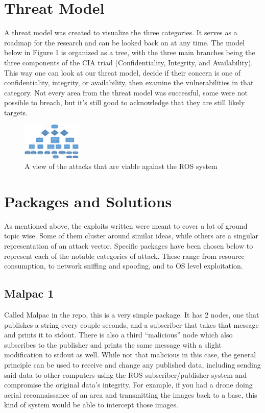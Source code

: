 \documentclass[IEEEtran,letterpaper,10pt,notitlepage,draftclsnofoot,onecolumn]{article}
\begin{document}
\section{Threat Model}
A threat model was created to visualize the three categories. It serves as a roadmap for the research and can be looked back on at any time.
The model below in Figure 1 is organized as a tree, with the three main branches being the three components of the CIA triad (Confidentiality, Integrity, and Availability).
This way one can look at our threat model, decide if their concern is one of confidentiality, integrity, or availability, then examine the vulnerabilities in that category.
Not every area from the threat model was successful, some were not possible to breach, but it’s still good to acknowledge that they are still likely targets.

\begin{figure}[h]
    \centering
    \includegraphics[width=0.25\textwidth]{model}
    \caption{A view of the attacks that are viable against the ROS system}
\end{figure}

\section{Packages and Solutions}
As mentioned above, the exploits written were meant to cover a lot of ground topic wise.
Some of them cluster around similar ideas, while others are a singular representation of an attack vector.
Specific packages have been chosen below to represent each of the notable categories of attack.
These range from resource consumption, to network sniffing and spoofing, and to OS level exploitation.

\subsection{Malpac 1}
Called Malpac in the repo, this is a very simple package. It has 2 nodes, one that publishes a string every couple seconds, and a subscriber that takes that message and prints it to stdout.
There is also a third “malicious” node which also subscribes to the publisher and prints the same message with a slight modification to stdout as well.
While not that malicious in this case, the general principle can be used to receive and change any published data, including sending said data to other computers using the ROS subscriber/publisher system and compromise the original data’s integrity.
For example, if you had a drone doing aerial reconnaissance of an area and transmitting the images back to a base, this kind of system would be able to intercept those images.
\end{document}
